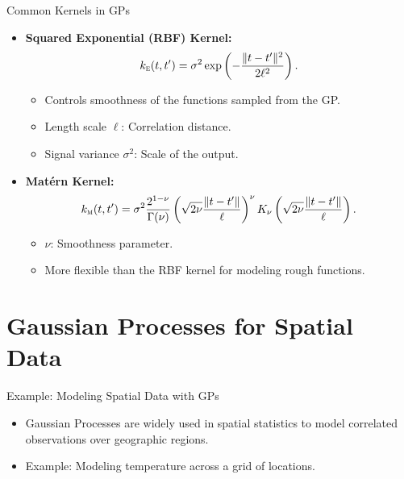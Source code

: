 \documentclass[11pt,handout,aspectratio=169]{beamer}
\begin{document}
\begin{frame}{Common Kernels in GPs}
\begin{itemize}
    \item \textbf{Squared Exponential (RBF) Kernel:}
    \[
    k_{\textsc{e}}(t, t') = \sigma^2 \exp\left(-\frac{\|t - t'\|^2}{2\ell^2}\right).
    \]
    \begin{itemize}
        \item Controls smoothness of the functions sampled from the GP.
        \item Length scale \( \ell \): Correlation distance.
        \item Signal variance \( \sigma^2 \): Scale of the output.
    \end{itemize}
    \item \textbf{Mat\'{e}rn Kernel:}
    \[
    k_{\textsc{m}}(t, t') = \sigma^2 \frac{2^{1-\nu}}{\Gamma(\nu)} \left(\sqrt{2\nu} \frac{\|t - t'\|}{\ell}\right)^\nu K_\nu\left(\sqrt{2\nu} \frac{\|t - t'\|}{\ell}\right).
    \]
    \begin{itemize}
        \item \( \nu \): Smoothness parameter.
        \item More flexible than the RBF kernel for modeling rough functions.
    \end{itemize}
\end{itemize}
\end{frame}

\section{Gaussian Processes for Spatial Data}

\begin{frame}{Example: Modeling Spatial Data with GPs}
\begin{itemize}
    \item Gaussian Processes are widely used in spatial statistics to model correlated observations over geographic regions.
    \item Example: Modeling temperature across a grid of locations.
\end{itemize}

\end{frame}
\end{document}
